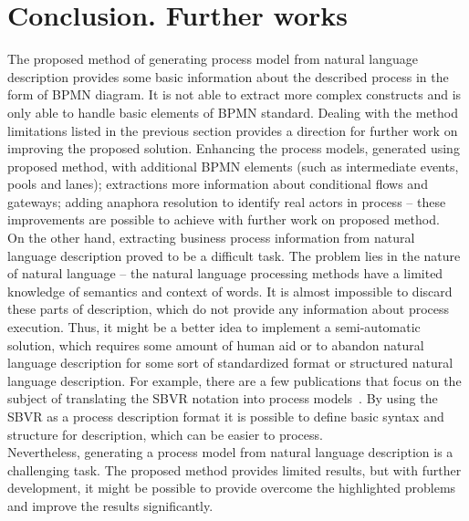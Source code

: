 \section{Conclusion. Further works}
The proposed method of generating process model from natural language description provides some basic information about the described process in the form of BPMN diagram. It is not able to extract more complex constructs and is only able to handle basic elements of BPMN standard. Dealing with the method limitations listed in the previous section provides a direction for further work on improving the proposed solution. Enhancing the process models, generated using proposed method, with additional BPMN elements (such as intermediate events, pools and lanes); extractions more information about conditional flows and gateways; adding anaphora resolution to identify real actors in process -- these improvements are possible to achieve with further work on proposed method.\\
On the other hand, extracting business process information from natural language description proved to be a difficult task. The problem lies in the nature of natural language -- the natural language processing methods have a limited knowledge of semantics and context of words. It is almost impossible to discard these parts of description, which do not provide any information about process execution. Thus, it might be a better idea to implement a semi-automatic solution, which requires some amount of human aid or to abandon natural language description for some sort of standardized format or structured natural language description. For example, there are a few publications that focus on the subject of translating the SBVR notation into process models~\cite{sbvr-automat}. By using the SBVR as a process description format it is possible to define basic syntax and structure for description, which can be easier to process.\\
Nevertheless, generating a process model from natural language description is a challenging task. The proposed method provides limited results, but with further development, it might be possible to provide overcome the highlighted problems and improve the results significantly.
